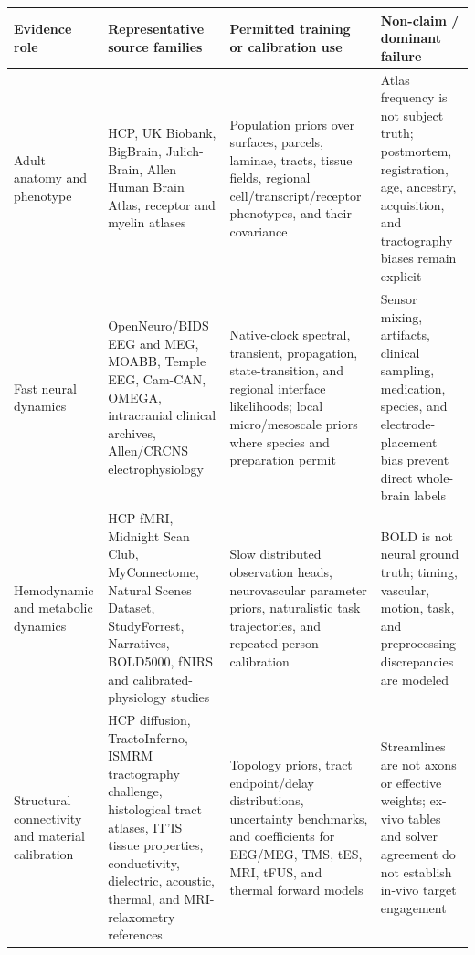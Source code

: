 \begin{table}[!h]
\centering
\scriptsize
\setlength{\tabcolsep}{3.5pt}
\renewcommand{\arraystretch}{1.08}
\begin{tabularx}{\textwidth}{@{}p{}p{}p{}X@{}}
\toprule
\textbf{Evidence role} & \textbf{Representative source families} &
\textbf{Permitted training or calibration use} & \textbf{Non-claim / dominant failure}\\
\midrule
Adult anatomy and phenotype &
HCP, UK Biobank, BigBrain, Julich-Brain, Allen Human Brain Atlas, receptor and
myelin atlases &
Population priors over surfaces, parcels, laminae, tracts, tissue fields,
regional cell/transcript/receptor phenotypes, and their covariance &
Atlas frequency is not subject truth; postmortem, registration, age,
ancestry, acquisition, and tractography biases remain explicit\\

Fast neural dynamics &
OpenNeuro/BIDS EEG and MEG, MOABB, Temple EEG, Cam-CAN, OMEGA, intracranial
clinical archives, Allen/CRCNS electrophysiology &
Native-clock spectral, transient, propagation, state-transition, and regional
interface likelihoods; local micro/mesoscale priors where species and
preparation permit &
Sensor mixing, artifacts, clinical sampling, medication, species, and
electrode-placement bias prevent direct whole-brain labels\\

Hemodynamic and metabolic dynamics &
HCP fMRI, Midnight Scan Club, MyConnectome, Natural Scenes Dataset, StudyForrest,
Narratives, BOLD5000, fNIRS and calibrated-physiology studies &
Slow distributed observation heads, neurovascular parameter priors,
naturalistic task trajectories, and repeated-person calibration &
BOLD is not neural ground truth; timing, vascular, motion, task, and
preprocessing discrepancies are modeled\\

Structural connectivity and material calibration &
HCP diffusion, TractoInferno, ISMRM tractography challenge, histological tract
atlases, IT'IS tissue properties, conductivity, dielectric, acoustic, thermal,
and MRI-relaxometry references &
Topology priors, tract endpoint/delay distributions, uncertainty benchmarks,
and coefficients for EEG/MEG, TMS, tES, MRI, tFUS, and thermal forward models &
Streamlines are not axons or effective weights; ex-vivo tables and solver
agreement do not establish in-vivo target engagement\\


\end{tabularx}
\end{table}
